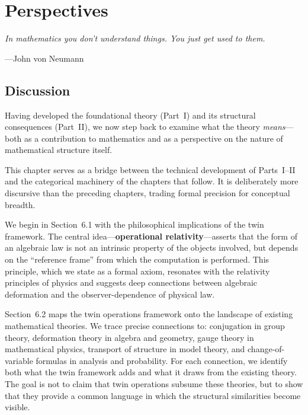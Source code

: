 \documentclass[11pt,a4paper,openany]{book}
\theoremstyle{plain}
\theoremstyle{definition}
\begin{document}
\part{Perspectives}
\label{part:perspectives}

\epigraph{\itshape In mathematics you don't understand things. You just get used to them.}{---John von Neumann}


\chapter{Discussion}
\label{ch:discussion}

Having developed the foundational theory (Part~I) and its structural consequences (Part~II), we now step back to examine what the theory \emph{means}---both as a contribution to mathematics and as a perspective on the nature of mathematical structure itself.

This chapter serves as a bridge between the technical development of Parts~I--II and the categorical machinery of the chapters that follow. It is deliberately more discursive than the preceding chapters, trading formal precision for conceptual breadth.

We begin in Section~6.1 with the philosophical implications of the twin framework. The central idea---\textbf{operational relativity}---asserts that the form of an algebraic law is not an intrinsic property of the objects involved, but depends on the ``reference frame'' from which the computation is performed. This principle, which we state as a formal axiom, resonates with the relativity principles of physics and suggests deep connections between algebraic deformation and the observer-dependence of physical law.

Section~6.2 maps the twin operations framework onto the landscape of existing mathematical theories. We trace precise connections to: conjugation in group theory, deformation theory in algebra and geometry, gauge theory in mathematical physics, transport of structure in model theory, and change-of-variable formulas in analysis and probability. For each connection, we identify both what the twin framework adds and what it draws from the existing theory. The goal is not to claim that twin operations subsume these theories, but to show that they provide a common language in which the structural similarities become visible.
\end{document}
